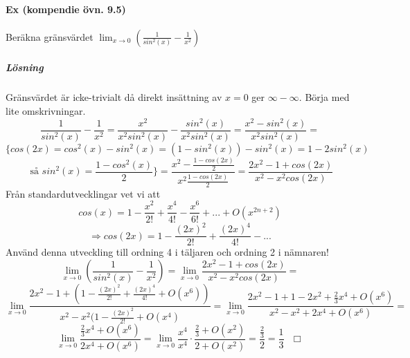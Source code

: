 \paragraph{Ex (kompendie övn. 9.5)} Beräkna gränsvärdet $\lim_{x\to 0}(\frac{1}{sin^2(x)}-\frac{1}{x^2})$
\subparagraph{Lösning} Gränsvärdet är icke-trivialt då direkt insättning av $x=0$ ger $\infty-\infty$.
Börja med lite omskrivningar.
\begin{equation*}
    \frac{1}{sin^2(x)}-\frac{1}{x^2}=\frac{x^2}{x^2sin^2(x)}-\frac{sin^2(x)}{x^2sin^2(x)}=\frac{x^2-sin^2(x)}{x^2sin^2(x)}=
\end{equation*}
\begin{equation*}
    \{cos(2x)=cos^2(x)-sin^2(x)=(1-sin^2(x))-sin^2(x)=1-2sin^2(x)
\end{equation*}
\begin{equation*}
    \text{ så } sin^2(x)=\frac{1-cos^2(x)}{2}\}=\frac{x^2-\frac{1-cos(2x)}{2}}{x^2\frac{1-cos(2x)}{2}}=\frac{2x^2-1+cos(2x)}{x^2-x^2cos(2x)}
\end{equation*}
Från standardutvecklingar vet vi att
\begin{equation*}
    cos(x)=1-\frac{x^2}{2!}+\frac{x^4}{4!}-\frac{x^6}{6!}+...+O(x^{2n+2})
\end{equation*}
\begin{equation*}
    \Rightarrow cos(2x)=1-\frac{(2x)^2}{2!}+\frac{(2x)^4}{4!}-...
\end{equation*}
Använd denna utveckling till ordning 4 i täljaren och ordning 2 i nämnaren!
\begin{equation*}
    \lim_{x\to 0}(\frac{1}{sin^2(x)}-\frac{1}{x^2})=\lim_{x\to 0}\frac{2x^2-1+cos(2x)}{x^2-x^2cos(2x)}=
\end{equation*}
\begin{equation*}
    \lim_{x\to 0}\frac{2x^2-1+(1-\frac{(2x)^2}{2!}+\frac{(2x)^4}{4!}+O(x^6))}{x^2-x^2(1-\frac{(2x)^2}{2!}+O(x^4)}=\lim_{x\to 0}\frac{2x^2-1+1-2x^2+\frac{2}{3}x^4+O(x^6)}{x^2-x^2+2x^4+O(x^6)}=
\end{equation*}
\begin{equation*}
    \lim_{x\to 0}\frac{\frac{2}{3}x^4+O(x^6)}{2x^4+O(x^6)}=\lim_{x\to 0}\frac{x^4}{x^4}\cdot\frac{\frac{2}{3}+O(x^2)}{2+O(x^2)}=\frac{\frac{2}{3}}{2}=\frac{1}{3} \text{ }\Box
\end{equation*}

